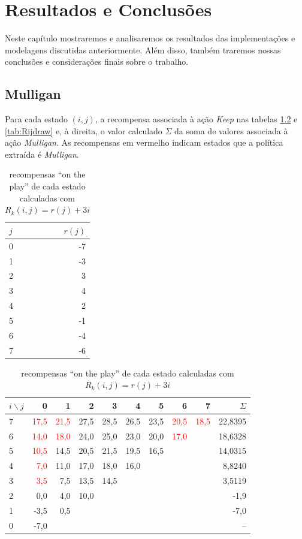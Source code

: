 \chapter{Resultados e Conclusões}
Neste capítulo mostraremos e analisaremos os resultados das implementações e modelagens discutidas anteriormente. Além disso, também traremos nossas conclusões e considerações finais sobre o trabalho.

\section{Mulligan}
Para cada estado $(i, j)$, a recompensa associada à ação \textit{Keep}
nas tabelas \ref{tab:Rijplay} e \ref{tab:Rijdraw} e, à direita, o valor calculado $\Sigma$ da soma de valores
associada à ação \textit{Mulligan}. As recompensas em vermelho indicam estados que a política extraída
é \textit{Mulligan}.

\begin{table}[!h]
\parbox{.25\linewidth}{
\centering
\vspace{0.2cm}
\begin{tabular}{l|r}
$j$  & $r(j)$ \\ \hline
0 & -7  \\
1 & -3     \\
2 & 3      \\
3 & 4      \\
4 & 2     \\
5 & -1    \\
6 & -4     \\
7 & -6
\end{tabular}
\caption{recompensas-base para $j = 0, \ldots, 7$ ``on the play''}
\label{tab:rjplay}
}
\hfill
\parbox{.70\linewidth}{
\centering
\begin{tabular}{l|rrrrrrrr|r}
$i \backslash j$ & 0     & 1  & 2  & 3  & 4  & 5  & 6  & 7  & $\Sigma$ \\ \hline
7 & \textcolor{red}{17,5} & \textcolor{red}{21,5} & 27,5 & 28,5 & 26,5 & 23,5 & \textcolor{red}{20,5} & \textcolor{red}{18,5}  & 22,8395\\
6 & \textcolor{red}{14,0} & \textcolor{red}{18,0} & 24,0 & 25,0 & 23,0 & 20,0 & \textcolor{red}{17,0} &       & 18,6328\\
5 & \textcolor{red}{10,5} & 14,5 & 20,5 & 21,5 & 19,5 & 16,5 && & 14,0315 \\
4 & \textcolor{red}{7,0} & 11,0 & 17,0 & 18,0 & 16,0 &&&& 8,8240 \\
3 & \textcolor{red}{3,5} & 7,5 & 13,5 & 14,5 &&&& & 3,5119\\
2 & 0,0 & 4,0 & 10,0 &&&&&& -1,9 \\
1 & -3,5 & 0,5 &&&&& && -7,0\\
0 & -7,0 &&&& &&&& --
\end{tabular}
\caption{recompensas ``on the play'' de cada estado calculadas com $R_k(i,j) = r(j) + 3i$}
\label{tab:Rijplay}
}
\end{table}

